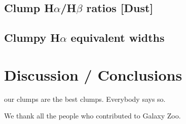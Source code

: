 \documentclass[twocolumn]{aastex6}
\begin{document}
\subsection{Clump H$\alpha$/H$\beta$ ratios [Dust]} \label{subsec:dust}

\subsection{Clumpy H$\alpha$ equivalent widths} \label{subsec:ew}





\section{Discussion / Conclusions}
our clumps are the best clumps. Everybody says so. 

\acknowledgments

We thank all the people who contributed to Galaxy Zoo. 



\vspace{5mm}



\end{document}
